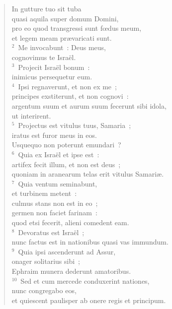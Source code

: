 \begin{flushleft}\begin{verse}\vspace{-19pt}In gutture tuo sit tuba\\ quasi aquila super domum Domini,\\ pro eo quod transgressi sunt fœdus meum,\\ et legem meam pr\ae varicati sunt.\\
${}^{2}$~Me invocabunt~: Deus meus,\\ cognovimus te Isra\"el.\\
${}^{3}$~Projecit Isra\"el bonum~:\\ inimicus persequetur eum.\\
${}^{4}$~Ipsi regnaverunt, et non ex me~;\\ principes exstiterunt, et non cognovi~:\\ argentum suum et aurum suum fecerunt sibi idola,\\ ut interirent.\\
${}^{5}$~Projectus est vitulus tuus, Samaria~;\\ iratus est furor meus in eos.\\ Usquequo non poterunt emundari~?\\
${}^{6}$~Quia ex Isra\"el et ipse est~:\\ artifex fecit illum, et non est deus~;\\ quoniam in aranearum telas erit vitulus Samari\ae .\\
${}^{7}$~Quia ventum seminabunt,\\ et turbinem metent~:\\ culmus stans non est in eo~;\\ germen non faciet farinam~:\\ quod etsi fecerit, alieni comedent eam.\\
${}^{8}$~Devoratus est Isra\"el~;\\ nunc factus est in nationibus quasi vas immundum.\\
${}^{9}$~Quia ipsi ascenderunt ad Assur,\\ onager solitarius sibi~;\\ Ephraim munera dederunt amatoribus.\\
${}^{10}$~Sed et cum mercede conduxerint nationes,\\ nunc congregabo eos,\\ et quiescent paulisper ab onere regis et principum.\\

\end{verse}
\end{flushleft}
